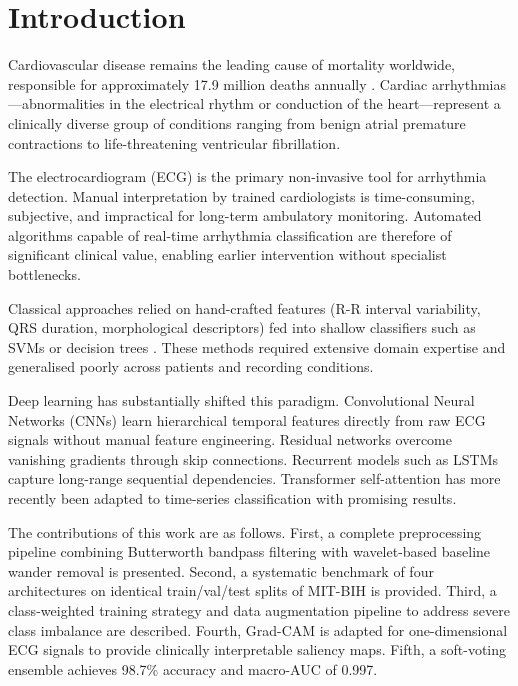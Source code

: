 \documentclass[conference]{IEEEtran}
\begin{document}
\section{Introduction}

Cardiovascular disease remains the leading cause of mortality worldwide, responsible for approximately 17.9 million deaths annually \cite{b1}. Cardiac arrhythmias---abnormalities in the electrical rhythm or conduction of the heart---represent a clinically diverse group of conditions ranging from benign atrial premature contractions to life-threatening ventricular fibrillation.

The electrocardiogram (ECG) is the primary non-invasive tool for arrhythmia detection. Manual interpretation by trained cardiologists is time-consuming, subjective, and impractical for long-term ambulatory monitoring. Automated algorithms capable of real-time arrhythmia classification are therefore of significant clinical value, enabling earlier intervention without specialist bottlenecks.

Classical approaches relied on hand-crafted features (R-R interval variability, QRS duration, morphological descriptors) fed into shallow classifiers such as SVMs or decision trees \cite{b2}. These methods required extensive domain expertise and generalised poorly across patients and recording conditions.

Deep learning has substantially shifted this paradigm. Convolutional Neural Networks (CNNs) learn hierarchical temporal features directly from raw ECG signals without manual feature engineering. Residual networks \cite{b3} overcome vanishing gradients through skip connections. Recurrent models such as LSTMs \cite{b4} capture long-range sequential dependencies. Transformer self-attention \cite{b5} has more recently been adapted to time-series classification with promising results.

The contributions of this work are as follows. First, a complete preprocessing pipeline combining Butterworth bandpass filtering with wavelet-based baseline wander removal is presented. Second, a systematic benchmark of four architectures on identical train/val/test splits of MIT-BIH is provided. Third, a class-weighted training strategy and data augmentation pipeline to address severe class imbalance are described. Fourth, Grad-CAM \cite{b6} is adapted for one-dimensional ECG signals to provide clinically interpretable saliency maps. Fifth, a soft-voting ensemble achieves 98.7\% accuracy and macro-AUC of 0.997.
\end{document}
